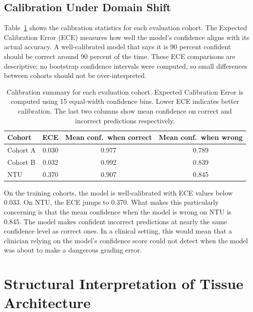 \documentclass[12pt, a4paper]{article}
\begin{document}
\subsection{Calibration Under Domain Shift}

Table~\ref{tab:calibration} shows the calibration statistics for each evaluation
cohort. The Expected Calibration Error (ECE) measures how well the model's
confidence aligns with its actual accuracy. A well-calibrated model that says it
is 90 percent confident should be correct around 90 percent of the time. These
ECE comparisons are descriptive; no bootstrap confidence intervals were computed,
so small differences between cohorts should not be over-interpreted.

\begin{table}[H]
\centering
\caption{Calibration summary for each evaluation cohort. Expected Calibration
Error is computed using 15 equal-width confidence bins. Lower ECE indicates
better calibration. The last two columns show mean confidence on correct and
incorrect predictions respectively.}
\label{tab:calibration}
\begin{tabular}{lccc}
\toprule
\textbf{Cohort} & \textbf{ECE} & \textbf{Mean conf.\ when correct} & \textbf{Mean conf.\ when wrong} \\
\midrule
Cohort A & 0.030 & 0.977 & 0.789 \\
Cohort B & 0.032 & 0.992 & 0.839 \\
NTU      & 0.370 & 0.907 & 0.845 \\
\bottomrule
\end{tabular}
\end{table}

On the training cohorts, the model is well-calibrated with ECE values below 0.033.
On NTU, the ECE jumps to 0.370. What makes this particularly concerning is that
the mean confidence when the model is wrong on NTU is 0.845. The model makes
confident incorrect predictions at nearly the same confidence level as correct
ones. In a clinical setting, this would mean that a clinician relying on the
model's confidence score could not detect when the model was about to make a
dangerous grading error.

\section{Structural Interpretation of Tissue Architecture}
\end{document}

